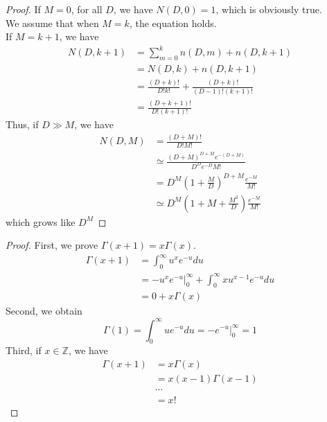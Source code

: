 \documentclass[12pt]{article}
\newenvironment{exercise}[2][Ex]{\begin{trivlist}
\item[\hskip \labelsep {\bfseries #1}\hskip \labelsep {\bfseries #2.}]}{\end{trivlist}}
\begin{document}
\begin{exercise}{1.16(***)}
    \begin{proof}
        If $M=0$, for all $D$, we have $N(D,0)=1$, which is obviously true.\\
        We assume that when $M=k$, the equation holds.\\
        If $M=k+1$, we have
        \begin{align*}
            N(D,k+1)&=\sum_{m=0}^kn(D,m)+n(D,k+1)\\
            &=N(D,k)+n(D,k+1)\\
            &=\frac{(D+k)!}{D!k!}+\frac{(D+k)!}{(D-1)!(k+1)!}\\
            &=\frac{(D+k+1)!}{D!(k+1)!}
        \end{align*}
        Thus, if $D\gg M$, we have
        \begin{align*}
            N(D,M)&=\frac{(D+M)!}{D!M!}\\
            &\simeq \frac{(D+M)^{D+M}e^{-(D+M)}}{D^De^{-D}M!}\\
            &=D^M(1+\frac{M}{D})^{D+M}\frac{e^{-M}}{M!}\\
            &\simeq D^M(1+M+\frac{M^2}{D})\frac{e^{-M}}{M!}
        \end{align*}
        which grows like $D^M$
    \end{proof}
\end{exercise}
\begin{exercise}{1.17(**)}
    \begin{proof}
        First, we prove $\Gamma(x+1)=x\Gamma(x)$.
        \begin{align*}
            \Gamma(x+1)&=\int_0^\infty u^xe^{-u}du\\
            &=-u^xe^{-u}\Big\vert_0^\infty+\int_0^\infty xu^{x-1}e^{-u}du\\
            &=0+x\Gamma(x)
        \end{align*}
        Second, we obtain
        \[
            \Gamma(1)=\int_0^\infty ue^{-u}du=-e^{-u}\Big\vert_0^\infty=1
            \]
        Third, if $x\in \mathbb{Z}$, we have
        \begin{align*}
            \Gamma(x+1)&=x\Gamma(x)\\
            &=x(x-1)\Gamma(x-1)\\
            &\cdots\\
            &=x!
        \end{align*}
    \end{proof}
\end{exercise}
\end{document}
